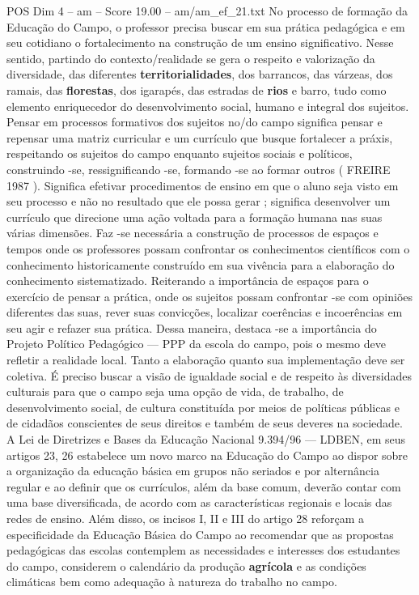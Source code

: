\begin{textsample}{POS Dim 4 – am – Score 19.00 – am/am\_ef\_21.txt}
No processo de formação da Educação do Campo, o professor precisa buscar em sua prática pedagógica e em seu cotidiano o fortalecimento na construção de um ensino significativo.
Nesse sentido, partindo do contexto/realidade se gera o respeito e valorização da diversidade, das diferentes \textbf{territorialidades}, dos barrancos, das várzeas, dos ramais, das \textbf{florestas}, dos igarapés, das estradas de \textbf{rios} e barro, tudo como elemento enriquecedor do desenvolvimento social, humano e integral dos sujeitos.
Pensar em processos formativos dos sujeitos no/do campo significa pensar e repensar uma matriz curricular e um currículo que busque fortalecer a práxis, respeitando os sujeitos do campo enquanto sujeitos sociais e políticos, construindo -se, ressignificando -se, formando -se ao formar outros ( FREIRE 1987 ).
Significa efetivar procedimentos de ensino em que o aluno seja visto em seu processo e não no resultado que ele possa gerar ; significa desenvolver um currículo que direcione uma ação voltada para a formação humana nas suas várias dimensões.
Faz -se necessária a construção de processos de espaços e tempos onde os professores possam confrontar os conhecimentos científicos com o conhecimento historicamente construído em sua vivência para a elaboração do conhecimento sistematizado.
Reiterando a importância de espaços para o exercício de pensar a prática, onde os sujeitos possam confrontar -se com opiniões diferentes das suas, rever suas convicções, localizar coerências e incoerências em seu agir e refazer sua prática.
Dessa maneira, destaca -se a importância do Projeto Político Pedagógico — PPP da escola do campo, pois o mesmo deve refletir a realidade local.
Tanto a elaboração quanto sua implementação deve ser coletiva.
É preciso buscar a visão de igualdade social e de respeito às diversidades culturais para que o campo seja uma opção de vida, de trabalho, de desenvolvimento social, de cultura constituída por meios de políticas públicas e de cidadãos conscientes de seus direitos e também de seus deveres na sociedade.
A Lei de Diretrizes e Bases da Educação Nacional 9.394/96 — LDBEN, em seus artigos 23, 26 estabelece um novo marco na Educação do Campo ao dispor sobre a organização da educação básica em grupos não seriados e por alternância regular e ao definir que os currículos, além da base comum, deverão contar com uma base diversificada, de acordo com as características regionais e locais das redes de ensino.
Além disso, os incisos I, II e III do artigo 28 reforçam a especificidade da Educação Básica do Campo ao recomendar que as propostas pedagógicas das escolas contemplem as necessidades e interesses dos estudantes do campo, considerem o calendário da produção \textbf{agrícola} e as condições climáticas bem como adequação à natureza do trabalho no campo.

\end{textsample}
